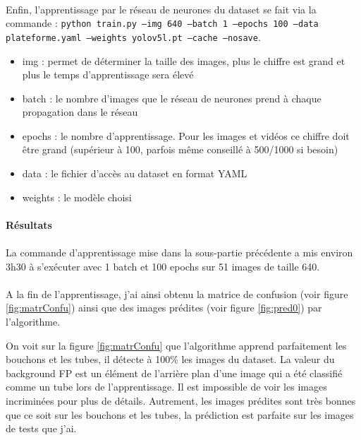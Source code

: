            \paragraph*{}
            Enfin, l'apprentissage par le réseau de neurones du dataset se fait via la commande : \texttt{python train.py --img 640 --batch 1 --epochs 100 --data plateforme.yaml --weights yolov5l.pt --cache --nosave}.
            
            \begin{itemize}
                \item img : permet de déterminer la taille des images, plus le chiffre est grand et plus le temps d'apprentissage sera élevé
                \item batch : le nombre d'images que le réseau de neurones prend à chaque propagation dans le réseau
                \item epochs : le nombre d'apprentissage. Pour les images et vidéos ce chiffre doit être grand (supérieur à 100, parfois même conseillé à 500/1000 si besoin)
                \item data : le fichier d'accès au dataset en format YAML
                \item weights : le modèle choisi
            \end{itemize}
            
        \paragraph{Résultats}
            \paragraph*{}
            La commande d'apprentissage mise dans la sous-partie précédente a mis environ 3h30 à s'exécuter avec 1 batch et 100 epochs sur 51 images de taille 640.
            
            \paragraph*{}
            A la fin de l'apprentissage, j'ai ainsi obtenu la matrice de confusion (voir figure \ref{fig:matrConfu}) ainsi que des images prédites (voir figure \ref{fig:pred0}) par l'algorithme.
            
            On voit sur la figure \ref{fig:matrConfu} que l'algorithme apprend parfaitement les bouchons et les tubes, il détecte à 100\% les images du dataset. La valeur du background FP est un élément de l'arrière plan d'une image qui a été classifié comme un tube lors de l'apprentissage. Il est impossible de voir les images incriminées pour plus de détails. Autrement, les images prédites sont très bonnes que ce soit sur les bouchons et les tubes, la prédiction est parfaite sur les images de tests que j'ai.
            
